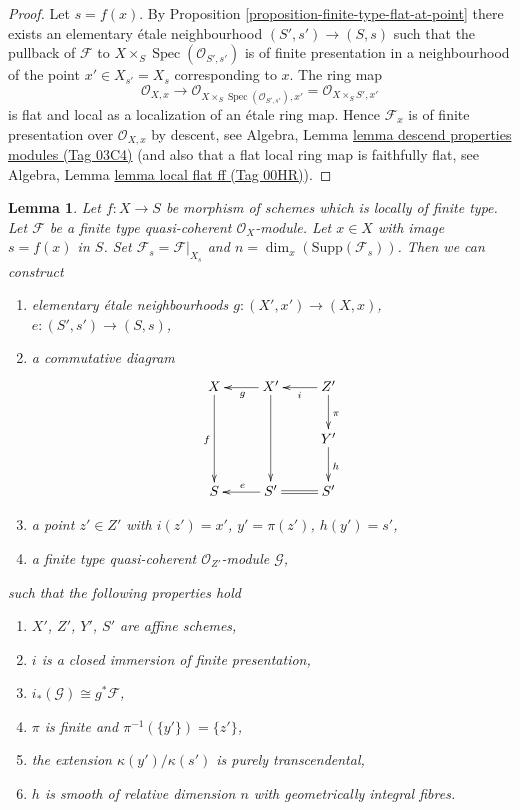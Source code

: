 \documentclass{amsart}
\theoremstyle{plain}
\newtheorem{lemma}[subsection]{Lemma}
\theoremstyle{definition}
\theoremstyle{remark}
\numberwithin{equation}{subsection}
\def\Spec{\mathop{\mathrm{Spec}}}
\begin{document}
\begin{proof}
Let $s = f(x)$. By
Proposition \ref{proposition-finite-type-flat-at-point}
there exists an elementary \'etale neighbourhood $(S', s') \to (S, s)$
such that the pullback of $\mathcal{F}$ to
$X \times_S \Spec(\mathcal{O}_{S', s'})$ is of
finite presentation in a neighbourhood of the point $x' \in X_{s'} = X_s$
corresponding to $x$. The ring map
$$
\mathcal{O}_{X, x} \longrightarrow
\mathcal{O}_{X \times_S \Spec(\mathcal{O}_{S', s'}), x'}
=
\mathcal{O}_{X \times_S S', x'}
$$
is flat and local as a localization of an \'etale ring map. Hence
$\mathcal{F}_x$ is of finite presentation over $\mathcal{O}_{X, x}$
by descent, see
Algebra, Lemma \href{https://stacks.math.columbia.edu/tag/03C4}{lemma descend properties modules (Tag 03C4)}
(and also that a flat local ring map is faithfully flat, see
Algebra, Lemma \href{https://stacks.math.columbia.edu/tag/00HR}{lemma local flat ff (Tag 00HR)}).
\end{proof}


\begin{lemma}
\label{lemma-elementary-devissage}
Let $f : X \to S$ be morphism of schemes which is locally of finite type.
Let $\mathcal{F}$ be a finite type quasi-coherent $\mathcal{O}_X$-module.
Let $x \in X$ with image $s = f(x)$ in $S$.
Set $\mathcal{F}_s = \mathcal{F}|_{X_s}$ and
$n = \dim_x(\text{Supp}(\mathcal{F}_s))$.
Then we can construct
\begin{enumerate}
\item elementary \'etale neighbourhoods $g : (X', x') \to (X, x)$,
$e : (S', s') \to (S, s)$,
\item a commutative diagram
$$
\xymatrix{
X \ar[dd]_f & X' \ar[dd] \ar[l]^g & Z' \ar[l]^i \ar[d]^\pi \\
& & Y' \ar[d]^h \\
S & S' \ar[l]_e & S' \ar@{=}[l]
}
$$
\item a point $z' \in Z'$ with $i(z') = x'$, $y' = \pi(z')$, $h(y') = s'$,
\item a finite type quasi-coherent $\mathcal{O}_{Z'}$-module $\mathcal{G}$,
\end{enumerate}
such that the following properties hold
\begin{enumerate}
\item $X'$, $Z'$, $Y'$, $S'$ are affine schemes,
\item $i$ is a closed immersion of finite presentation,
\item $i_*(\mathcal{G}) \cong g^*\mathcal{F}$,
\item $\pi$ is finite and $\pi^{-1}(\{y'\}) = \{z'\}$,
\item the extension $\kappa(y')/\kappa(s')$ is purely transcendental,
\item $h$ is smooth of relative dimension $n$
with geometrically integral fibres.
\end{enumerate}
\end{lemma}
\end{document}

